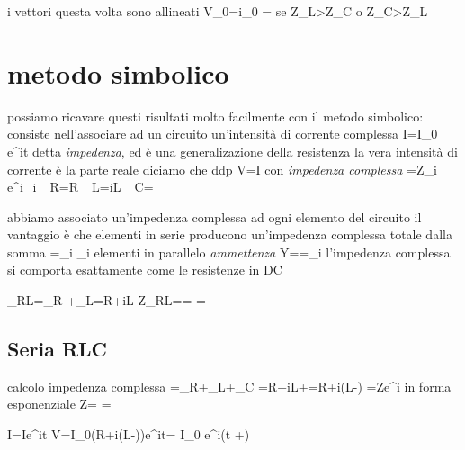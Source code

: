 {{\begin{examplewt}[AC, serie RC]
\end{examplewt}

\begin{examplewt}[AC, serie LC]
	i vettori questa volta sono allineati
	V_0=i_0
	\oldphi=\pm{} se Z_L>Z_C o Z_C>Z_L
	
	
\end{examplewt}

\section{metodo simbolico}
possiamo ricavare questi risultati molto facilmente con il metodo simbolico: consiste nell'associare ad un circuito un'intensità di corrente complessa I=I_0 e^{i\omega t} detta \textit{impedenza}, ed è una generalizazione della resistenza
la vera intensità di corrente è la parte reale
diciamo che ddp V=I con \in\omcplexset 
\textit{impedenza complessa} =Z_i e^{i\oldphi_i}
	_R=R
	_L=i\omega L
	_C=

abbiamo associato un'impedenza complessa ad ogni elemento del circuito
il vantaggio è che elementi in serie producono un'impedenza complessa totale dalla somma
=\sum_i _i
elementi in parallelo
\textit{ammettenza} Y==\sum_i 
l'impedenza complessa si comporta esattamente come le resistenze in DC

_{RL}=_R +_L=R+i\omega L
Z_{RL}==
\tan\oldphi=

\subsection{Seria RLC}
calcolo impedenza complessa
=_R+_L+_C
=R+i\omega L+=R+i(\omega L-)  =Ze^{i\oldphi} in forma esponenziale
Z=
\tan\oldphi=

I=Ie^{i\omega t}
V=I_0(R+i(\omega L-))e^{i\omega t}= I_0  e^{i(\omega t +\oldphi)}


}}
